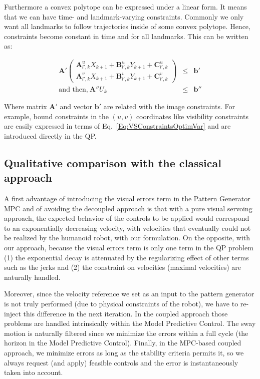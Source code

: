 Furthermore a convex polytope can be expressed under a linear form. It means that we can have time- and landmark-varying constraints. Commonly we only want all landmarks to follow trajectories inside of some convex polytope. Hence, constraints become constant in time and for all landmarks. This can be written as:

\begin{eqnarray}
 \mathbf A'
 \left(
 \begin{matrix}
 \mathbf A^u_{l',k} X_{k+1} + \mathbf B^u_{l',k} Y_{k+1} + \mathbf C^u_{l',k} \\
 \mathbf A^v_{l',k} X_{k+1} + \mathbf B^v_{l',k} Y_{k+1} + \mathbf C^v_{l',k}
 \end{matrix}
 \right) &\leq& \mathbf b'
 \label{Eq:VSConstraintsOptimVar}\\
\nonumber
\text{and then,} ~ \mathbf A'' U_k &\leq& \mathbf b''
\end{eqnarray}

Where matrix $\mathbf A'$ and vector $\mathbf b'$ are related with the image constraints. For example, bound constraints in the $(u,v)$ coordinates like visibility constraints are easily expressed in terms of Eq.~\ref{Eq:VSConstraintsOptimVar} and are introduced directly in the QP.


\subsection{Qualitative comparison with the classical approach}

\label{subsection:qualdiscussion}

A first advantage of introducing the visual errors term in the Pattern Generator MPC and of avoiding the decoupled approach is that with a pure visual servoing approach, the expected behavior of the controls to be applied would correspond to an exponentially decreasing velocity, with velocities that eventually could not be realized by the humanoid robot, with our formulation. On the opposite, with our approach, because the visual errors term is only one term in the QP problem (1) the exponential decay is attenuated by the regularizing effect of other terms such as the jerks and (2) the constraint on velocities (maximal velocities) are naturally handled.   

Moreover, since the velocity reference we set as an input to the pattern generator is not truly performed (due to physical constraints of the robot), we have to re-inject this difference in the next iteration. In the coupled approach those problems are handled intrinsically within the Model Predictive Control. The sway motion is naturally filtered since we minimize the errors within a full cycle (the horizon in the Model Predictive Control). Finally, in the MPC-based coupled approach, we minimize errors as long as the stability criteria permits it, so we always request (and apply) feasible controls and the error is instantaneously taken into account.

